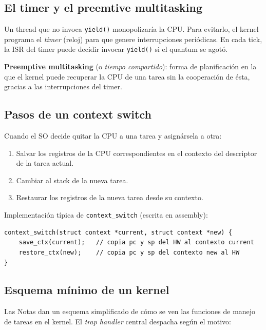 \documentclass[11pt,a4paper]{article}
\begin{document}
\subsection{El timer y el preemtive multitasking}

Un thread que no invoca \texttt{yield()} monopolizaría la CPU.
Para evitarlo, el kernel programa el \emph{timer} (reloj) para que
genere interrupciones periódicas. En cada tick, la ISR del timer
puede decidir invocar \texttt{yield()} si el quantum se agotó.

\begin{definicion}
\textbf{Preemptive multitasking} (o \emph{tiempo compartido}): forma
de planificación en la que el kernel puede recuperar la CPU de una
tarea sin la cooperación de ésta, gracias a las interrupciones del
timer.
\end{definicion}

\subsection{Pasos de un context switch}

Cuando el SO decide quitar la CPU a una tarea y asignársela a otra:

\begin{enumerate}[leftmargin=*,nosep]
    \item Salvar los registros de la CPU correspondientes en el
        contexto del descriptor de la tarea actual.
    \item Cambiar al stack de la nueva tarea.
    \item Restaurar los registros de la nueva tarea desde su contexto.
\end{enumerate}

Implementación típica de \texttt{context\_switch} (escrita en
assembly):

\begin{lstlisting}[style=cstyle]
context_switch(struct context *current, struct context *new) {
    save_ctx(current);   // copia pc y sp del HW al contexto current
    restore_ctx(new);    // copia pc y sp del contexto new al HW
}
\end{lstlisting}

\subsection{Esquema mínimo de un kernel}

Las Notas dan un esquema simplificado de cómo se ven las funciones de
manejo de tareas en el kernel. El \emph{trap handler} central despacha
según el motivo:
\end{document}
